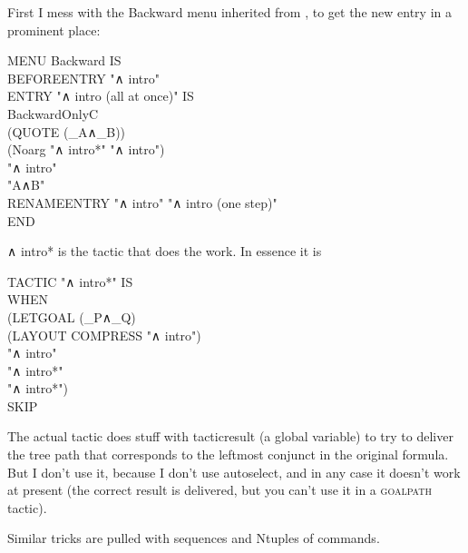 First I mess with the Backward menu inherited from , to get the new entry in a prominent place:
\begin{japeish}
MENU Backward IS \\
\tab BEFOREENTRY "∧ intro" \\
\tab \tab ENTRY "∧ intro (all at once)" IS \\
\tab \tab \tab BackwardOnlyC  \\
\tab \tab \tab \tab (QUOTE (\_A∧\_B)) \\
\tab \tab \tab \tab (Noarg "∧ intro*" "∧ intro") \\
\tab \tab \tab \tab "∧ intro" \\
\tab \tab \tab \tab "A∧B" \\
\tab RENAMEENTRY "∧ intro" "∧ intro (one step)" \\
END
\end{japeish}
∧ intro* is the tactic that does the work. In essence it is
\begin{japeish}
TACTIC "∧ intro*"  IS \\
\tab WHEN \\
\tab \tab (LETGOAL (\_P∧\_Q)\\
\tab \tab \tab (LAYOUT COMPRESS "∧ intro") \\
\tab \tab \tab "∧ intro" \\
\tab \tab \tab "∧ intro*" \\
\tab \tab \tab "∧ intro*")\\
\tab \tab SKIP
\end{japeish}
The actual tactic does stuff with tacticresult (a global variable) to try to deliver the tree path that corresponds to the leftmost conjunct in the original formula. But I don't use it, because I don't use autoselect, and in any case it doesn't work at present (the correct result is delivered, but you can't use it in a \textsc{goalpath} tactic).

Similar tricks are pulled with sequences and Ntuples of commands.

